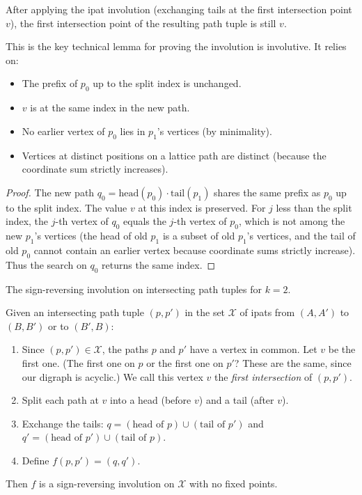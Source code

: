\begin{lemma}
\label{lem.lgv.first-intersection-preserved}
\leanhelper
\leanok
After applying the ipat involution (exchanging tails at the first
intersection point $v$), the first intersection point of the
resulting path tuple is still $v$.

This is the key technical lemma for proving the involution is
involutive. It relies on:
\begin{itemize}
\item The prefix of $p_0$ up to the split index is unchanged.
\item $v$ is at the same index in the new path.
\item No earlier vertex of $p_0$ lies in $p_1$'s vertices (by minimality).
\item Vertices at distinct positions on a lattice path are distinct
  (because the coordinate sum strictly increases).
\end{itemize}
\end{lemma}

\begin{proof}
The new path $q_0 = \mathrm{head}(p_0) \cdot \mathrm{tail}(p_1)$ shares
the same prefix as $p_0$ up to the split index. The value
$v$ at this index is preserved.
For $j$ less than the split index, the $j$-th vertex of $q_0$
equals the $j$-th vertex of $p_0$, which is not among the new $p_1$'s
vertices (the head of old $p_1$ is a subset of old $p_1$'s
vertices, and the tail of old $p_0$ cannot contain an earlier
vertex because coordinate sums strictly increase). Thus
the search on $q_0$ returns the same index.
\end{proof}

\begin{lemma}
\label{lem.lgv.2paths.signedipat}
\leanhelper
\leanok
The sign-reversing involution on intersecting path tuples for $k = 2$.

Given an intersecting path tuple $(p, p')$ in the set
$\mathcal{X}$ of ipats from $(A, A')$ to $(B, B')$ or to $(B', B)$:

\begin{enumerate}
\item Since $(p, p') \in \mathcal{X}$, the paths $p$ and $p'$ have a
  vertex in common. Let $v$ be the first one.
  (The first one on $p$ or the first one on $p'$? These are the same, since
  our digraph is acyclic.)
  We call this vertex $v$ the \emph{first intersection} of $(p, p')$.
\item Split each path at $v$ into a head (before $v$) and a tail (after $v$).
\item Exchange the tails:
  $q = (\text{head of } p) \cup (\text{tail of } p')$ and
  $q' = (\text{head of } p') \cup (\text{tail of } p)$.
\item Define $f(p, p') = (q, q')$.
\end{enumerate}

Then $f$ is a sign-reversing involution on $\mathcal{X}$ with no fixed
points.
\end{lemma}

